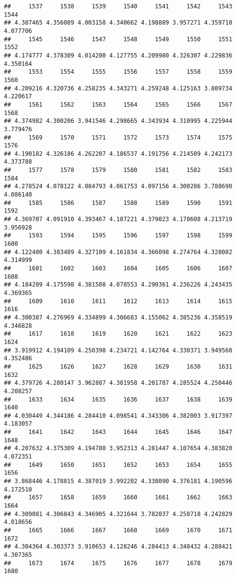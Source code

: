 \documentclass[
]{article}
\begin{document}
\begin{verbatim}
##     1537     1538     1539     1540     1541     1542     1543     1544 
## 4.387465 4.356089 4.003158 4.340662 4.198889 3.957271 4.359710 4.077706 
##     1545     1546     1547     1548     1549     1550     1551     1552 
## 4.174777 4.378309 4.014200 4.127755 4.209980 4.326307 4.229836 4.350164 
##     1553     1554     1555     1556     1557     1558     1559     1560 
## 4.209216 4.320736 4.258235 4.343271 4.259248 4.125163 3.809734 4.220617 
##     1561     1562     1563     1564     1565     1566     1567     1568 
## 4.374982 4.300206 3.941546 4.298665 4.343934 4.310995 4.225944 3.779476 
##     1569     1570     1571     1572     1573     1574     1575     1576 
## 4.190182 4.326186 4.262207 4.186537 4.191756 4.214509 4.242173 4.373788 
##     1577     1578     1579     1580     1581     1582     1583     1584 
## 4.278524 4.078122 4.084793 4.061753 4.097156 4.300286 3.788690 4.086140 
##     1585     1586     1587     1588     1589     1590     1591     1592 
## 4.369707 4.091910 4.393467 4.187221 4.379023 4.170608 4.213719 3.956928 
##     1593     1594     1595     1596     1597     1598     1599     1600 
## 4.122400 4.383489 4.327109 4.161834 4.366098 4.274764 4.328082 4.314999 
##     1601     1602     1603     1604     1605     1606     1607     1608 
## 4.184209 4.175598 4.381508 4.078553 4.290361 4.236226 4.243435 4.369365 
##     1609     1610     1611     1612     1613     1614     1615     1616 
## 4.300387 4.276969 4.334899 4.306683 4.155062 4.385236 4.358519 4.346828 
##     1617     1618     1619     1620     1621     1622     1623     1624 
## 3.919912 4.194109 4.250398 4.234721 4.142764 4.330371 3.949560 4.352486 
##     1625     1626     1627     1628     1629     1630     1631     1632 
## 4.379726 4.280147 3.962807 4.381958 4.201787 4.285524 4.250446 4.208257 
##     1633     1634     1635     1636     1637     1638     1639     1640 
## 4.030449 4.344186 4.284410 4.098541 4.343306 4.382003 3.917397 4.183057 
##     1641     1642     1643     1644     1645     1646     1647     1648 
## 4.207632 4.375309 4.194780 3.952313 4.281447 4.107654 4.383820 4.072351 
##     1649     1650     1651     1652     1653     1654     1655     1656 
## 3.868446 4.178815 4.387019 3.992202 4.338090 4.376181 4.190596 4.172510 
##     1657     1658     1659     1660     1661     1662     1663     1664 
## 4.309081 4.306843 4.346905 4.321644 3.782037 4.250718 4.242829 4.018656 
##     1665     1666     1667     1668     1669     1670     1671     1672 
## 4.304364 4.303373 3.910653 4.128246 4.284413 4.340432 4.288421 4.307365 
##     1673     1674     1675     1676     1677     1678     1679     1680 

\end{verbatim}
\end{document}
